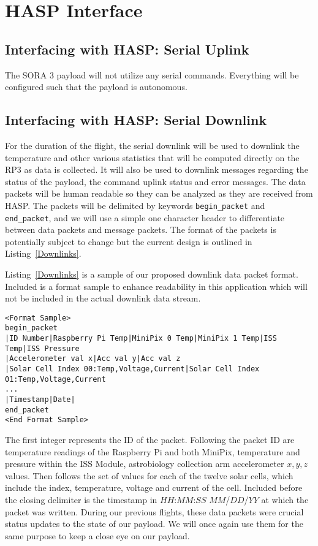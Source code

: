 \section{HASP Interface}
\label{sec:HaspInterface}

\subsection{Interfacing with HASP: Serial Uplink}
The SORA 3 payload will not utilize any serial commands. Everything will be configured such that the payload is autonomous.

\subsection{Interfacing with HASP: Serial Downlink}
For the duration of the flight, the serial downlink will be used to downlink the temperature and other various statistics that will be computed directly on the RP\num{3} as data is collected. It will also be used to downlink messages regarding the status of the payload, the command uplink status and error messages. The data packets will be human readable so they can be analyzed as they are received from HASP. The packets will be delimited by keywords \verb|begin_packet| and \verb|end_packet|, and we will use a simple one character header to differentiate between data packets and message packets. The format of the packets is potentially subject to change but the current design is outlined in Listing~\ref{Downlinks}.

Listing~\ref{Downlinks} is a sample of our proposed downlink data packet format. Included is a format sample to enhance readability in this application which will not be included in the actual downlink data stream.

\lstset{basicstyle=\small, numbers=left, xleftmargin=2em, frame=tb, label = Downlinks, framexleftmargin=1.5em}
\begin{lstlisting}[caption = Sample of proposed downlink data packets ID: 15667 - 15669]
<Format Sample>
begin_packet
|ID Number|Raspberry Pi Temp|MiniPix 0 Temp|MiniPix 1 Temp|ISS Temp|ISS Pressure
|Accelerometer val x|Acc val y|Acc val z
|Solar Cell Index 00:Temp,Voltage,Current|Solar Cell Index 01:Temp,Voltage,Current
...
|Timestamp|Date|
end_packet
<End Format Sample>
\end{lstlisting}
\medskip

The first integer represents the ID of the packet. Following the packet ID are temperature readings of the Raspberry Pi and both MiniPix, temperature and pressure within the ISS Module, astrobiology collection arm accelerometer $x, y, z$ values. Then follows the set of values for each of the twelve solar cells, which include the index, temperature, voltage and current of the cell. Included before the closing delimiter is the timestamp in $HH$:$MM$:$SS$ $MM$/$DD$/$YY$ at which the packet was written.  
During our previous flights, these data packets were crucial status updates to the state of our payload. We will once again use them for the same purpose to keep a close eye on our payload.

